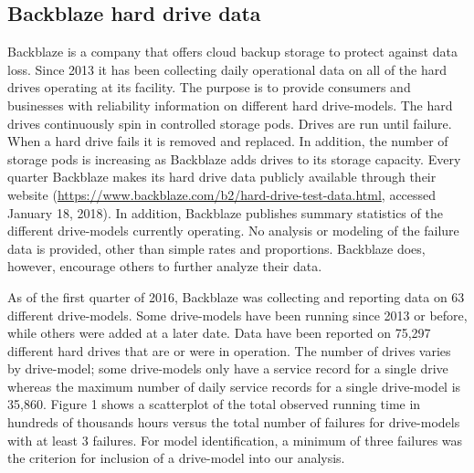 \documentclass[11pt]{article}
\begin{document}
\subsection{Backblaze hard drive data}
Backblaze is a company that offers cloud backup storage to protect against data loss.  Since 2013 it has been collecting daily operational data on all of the hard drives operating at its facility.  The purpose is to provide consumers and businesses with reliability information on different hard drive-models.  The hard drives continuously spin in controlled storage pods.  Drives are run until failure.  When a hard drive fails it is removed and replaced.  In addition, the number of storage pods is increasing as Backblaze adds drives to its storage capacity.  Every quarter Backblaze makes its hard drive data publicly available through their website (\url{https://www.backblaze.com/b2/hard-drive-test-data.html}, accessed January 18, 2018)\nocite{backblaze}. In addition, Backblaze publishes summary statistics of the different drive-models currently operating.  No analysis or modeling of the failure data is provided, other than simple rates and proportions.  Backblaze does, however, encourage others to further analyze their data. 

As of the first quarter of 2016, Backblaze was collecting and reporting data on 63 different drive-models.  Some drive-models have been running since 2013 or before, while others were added at a later date.  Data have been reported on 75,297 different hard drives that are or were in operation.  The number of drives varies by drive-model; some drive-models only have a service record for a single drive whereas the maximum number of daily service records for a single drive-model is 35,860.  Figure 1 shows a scatterplot of the total observed running time in hundreds of thousands hours versus the total number of failures for drive-models with at least 3 failures.  For model identification, a minimum of three failures was the criterion for inclusion of a drive-model into our analysis.  
\end{document}
